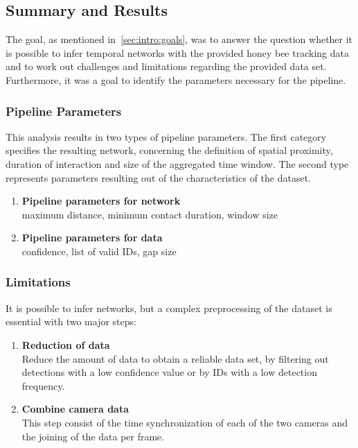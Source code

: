 \subsection{Summary and Results}
The goal, as mentioned in~\ref{sec:intro:goals}, was to answer the question whether it is possible to infer temporal networks with the provided honey bee tracking data and to work out challenges and limitations regarding the provided data set. Furthermore, it was a goal to identify the parameters necessary for the pipeline.

\subsubsection{Pipeline Parameters}
This analysis results in two types of pipeline parameters. The first category specifies the resulting network, concerning the definition of spatial proximity, duration of interaction and size of the aggregated time window. The second type represents parameters resulting out of the characteristics of the dataset.

\begin{enumerate}
\item \textbf{Pipeline parameters for network}\\
maximum distance, minimum contact duration, window size
\item \textbf{Pipeline parameters for data}\\
confidence, list of valid IDs, gap size
\end{enumerate}


\subsubsection{Limitations}
It is possible to infer networks, but a complex preprocessing of the dataset is essential with two major steps:

\begin{enumerate}
\item \textbf{Reduction of data}\\
Reduce the amount of data to obtain a reliable data set, by filtering out detections with a low confidence value or by IDs with a low detection frequency.
\item \textbf{Combine camera data}\\
This step consist of the time synchronization of each of the two cameras and the joining of the data per frame.
\end{enumerate}

